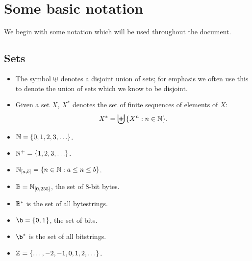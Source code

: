 \section{Some basic notation}
\label{sec:notation}
We begin with some notation which will be used throughout the document.

\subsection{Sets}
\label{sec:notation-sets}
\begin{itemize}
  \item The symbol $\uplus$ denotes a disjoint union of sets;  for emphasis we often use this
    to denote the union of sets which we know to be disjoint.%

  \item Given a set $X$, $X^*$ denotes the set of finite sequences of elements of $X$:
    $$
    X^*= \biguplus{\{X^n: n \in \mathbb{N}\}}.
    $$%
  \item $\mathbb{N} = \{0,1,2,3,\ldots\}$.%

  \item $\mathbb{N}^{+} = \{1,2,3,\ldots\}$.%

  \item $\mathbb{N}_{[a,b]} = \{n \in \mathbb{N}: a \leq n \leq b\}$.%

  \item $\mathbb{B} = \mathbb{N}_{[0,255]}$, the set of 8-bit bytes.%

  \item $\mathbb{B}^*$ is the set of all bytestrings.%

  \item $\b = \{\mathtt{0}, \mathtt{1}\}$, the set of bits.%

  \item $\b^*$ is the set of all bitstrings.%

  \item $\mathbb{Z} = \{\ldots, -2, -1, 0, 1, 2, \ldots\}$.%


\end{itemize}
